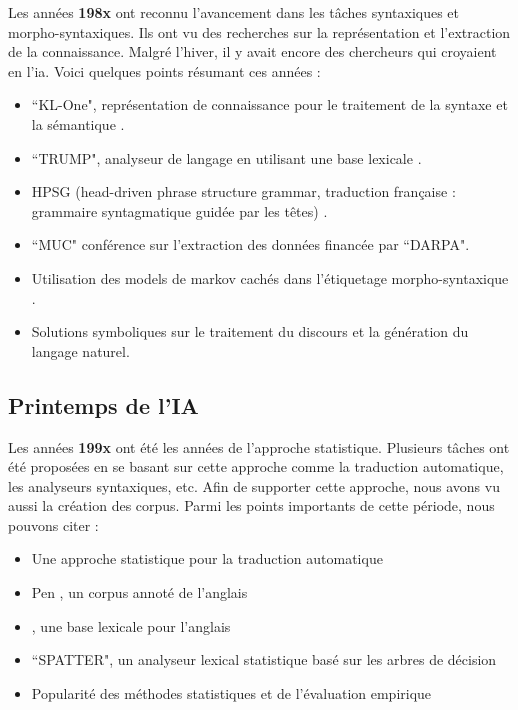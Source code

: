 \documentclass{KodeBook}
\begin{document}
Les années \textbf{198x} ont reconnu l'avancement dans les tâches syntaxiques et morpho-syntaxiques. 
Ils ont vu des recherches sur la représentation et l'extraction de la connaissance. 
Malgré l'hiver, il y avait encore des chercheurs qui croyaient en l'\ac{ia}. 
Voici quelques points résumant ces années :
\begin{itemize}
	\item {} ``KL-One", représentation de connaissance pour le traitement de la syntaxe et la sémantique \cite{1980-bobrow}.
	\item {} ``TRUMP", analyseur de langage en utilisant une base lexicale \cite{1986-jacobs}.
	\item {} HPSG (head-driven phrase structure grammar, traduction française : grammaire syntagmatique guidée par les têtes) \cite{1987-sag-pollard}.
	\item {} ``MUC" conférence sur l'extraction des données financée par ``DARPA".
	\item {} Utilisation des models de markov cachés dans  l'étiquetage morpho-syntaxique \cite{1988-church}.
	\item Solutions symboliques sur le traitement du discours et la génération du langage naturel.
\end{itemize}

\subsection{Printemps de l'IA}

Les années \textbf{199x} ont été les années de l'approche statistique. 
Plusieurs tâches ont été proposées en se basant sur cette approche comme la traduction automatique, les analyseurs syntaxiques, etc. 
Afin de supporter cette approche, nous avons vu aussi la création des corpus. 
Parmi les points importants de cette période, nous pouvons citer :
\begin{itemize}
	\item {} Une approche statistique pour la traduction automatique \cite{1990-brown-al}
	\item {} Pen , un corpus annoté de l'anglais \cite{1993-marcus-al}
	\item {} , une base lexicale pour l'anglais \cite{1995-miller}
	\item {} ``SPATTER", un analyseur lexical statistique basé sur les arbres de décision \cite{1996-magerman}
	\item Popularité des méthodes statistiques et de l'évaluation empirique
\end{itemize}
\end{document}
